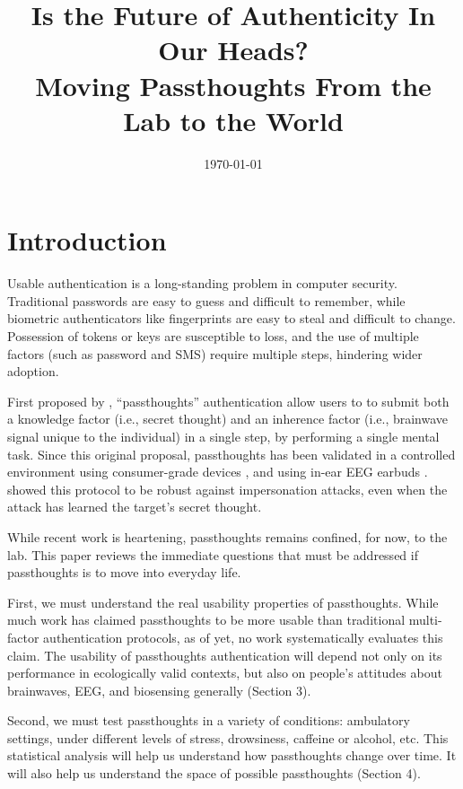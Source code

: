 \documentclass[sigconf]{acmart}
\date{\today}
\title{Is the Future of Authenticity In Our Heads?\\\medskip
\large Moving Passthoughts From the Lab to the World}
\begin{document}
\maketitle

\section{Introduction}
\label{sec:org2972ffd}

Usable authentication is a long-standing problem in computer security.
Traditional passwords are easy to guess and difficult to remember,
while biometric authenticators like fingerprints are easy to steal and difficult to change.
Possession of tokens or keys are susceptible to loss, 
and the use of multiple factors (such as password and SMS) require multiple steps, hindering wider adoption.

First proposed by \cite{Thorpe2005}, ``passthoughts'' authentication allow users to 
to submit both a knowledge factor (i.e., secret thought) and an inherence factor (i.e., brainwave signal unique to the individual) 
in a single step, by performing a single mental task.
Since this original proposal, passthoughts has been validated in a controlled environment using consumer-grade devices \cite{Chuang2013b}, 
and using in-ear EEG earbuds \cite{curranpassthoughts}.
\cite{Johnson2014} showed this protocol to be robust against impersonation attacks, even when the attack has learned the target's secret thought.

While recent work is heartening, passthoughts remains confined, for now, to the lab.
This paper reviews the immediate questions that must be addressed if passthoughts is to move into everyday life.

First, we must understand the real usability properties of passthoughts.
While much work has claimed passthoughts to be more usable than traditional multi-factor authentication protocols,
as of yet, no work systematically evaluates this claim.
The usability of passthoughts authentication will depend not only on its performance in ecologically valid contexts,
but also on people's attitudes about brainwaves, EEG, and biosensing generally (Section 3).

Second, we must test passthoughts in a variety of conditions: ambulatory settings, under different levels of stress, drowsiness, caffeine or alcohol, etc.
This statistical analysis will help us understand how passthoughts change over time.
It will also help us understand the space of possible passthoughts (Section 4).
\end{document}
